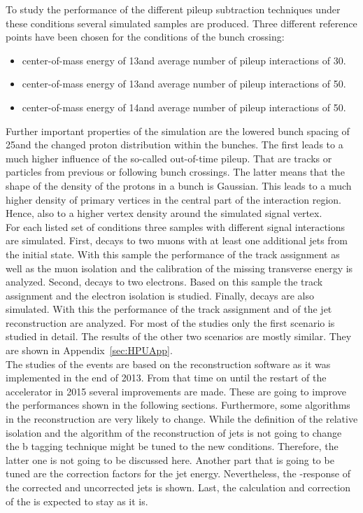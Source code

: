 To study the performance of the different pileup subtraction techniques under these conditions several simulated samples are produced. Three different reference points have been chosen for the conditions of the bunch crossing:
\begin{itemize}
\item center-of-mass energy of 13\TeV and average number of pileup interactions of 30.
\item center-of-mass energy of 13\TeV and average number of pileup interactions of 50.
\item center-of-mass energy of 14\TeV and average number of pileup interactions of 50.
\end{itemize}
Further important properties of the simulation are the lowered bunch spacing of 25\ns and the changed proton distribution within the bunches. The first leads to a much higher influence of the so-called out-of-time pileup. That are tracks or particles from previous or following bunch crossings. The latter means that the shape of the density of the protons in a bunch is Gaussian. This leads to a much higher density of primary vertices in the central part of the interaction region. Hence, also to a higher vertex density around the simulated signal vertex. \\
For each listed set of conditions three samples with different signal interactions are simulated. First, \Zz decays to two muons with at least one additional jets from the initial state. With this sample the performance of the track assignment as well as the muon isolation and the calibration of the missing transverse energy \ETmiss is analyzed. Second, \Zz decays to two electrons. Based on this sample the track assignment and the electron isolation is studied. Finally, \ttbar decays are also simulated. With this the performance of the track assignment and of the jet reconstruction are analyzed. For most of the studies only the first scenario is studied in detail. The results of the other two scenarios are mostly similar. They are shown in Appendix~\ref{sec:HPUApp}. \\
The studies of the events are based on the reconstruction software as it was implemented in the end of 2013. From that time on until the restart of the accelerator in 2015 several improvements are made. These are going to improve the performances shown in the following sections. Furthermore, some algorithms in the reconstruction are very likely to change. While the definition of the relative isolation and the algorithm of the reconstruction of jets is not going to change the b tagging technique might be tuned to the new conditions. Therefore, the latter one is not going to be discussed here. Another part that is going to be tuned are the correction factors for the jet energy. Nevertheless, the \pt{}-response of the corrected and uncorrected jets is shown. Last, the calculation and correction of the \MET{} is expected to stay as it is.

